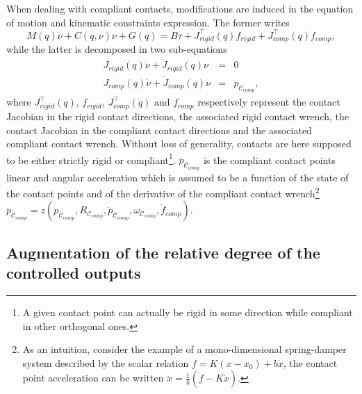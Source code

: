 \documentclass[12pt,a4paper,twoside]{article}
\begin{document}
When dealing with compliant contacts, modifications are induced in the equation of motion and kinematic constraints expression. The former writes
\begin{equation}
{M}(q) {\dot{\nu}}+{C}({q},{\nu}){\nu} + G(q) = {B} {\tau} + J^\top_{rigid} (q) f_{rigid} + J^\top_{comp} (q) f_{comp}, \label{eq:compliant dyn model}
\end{equation}
while the latter is decomposed in two sub-equations
\begin{subequations}\label{eq:kin constraints}
\begin{eqnarray}
J_{rigid}(q) \dot\nu + \dot{J}_{rigid}(q) \nu & = & 0 \label{eq:kin constraints rigid}\\  
J_{comp}(q) \dot\nu + \dot{J}_{comp}(q) \nu & = & \ddot{p}_{\mathcal{C}_{comp}}\label{eq:kin constraints comp},%
\end{eqnarray}               
\end{subequations}
where $J^\top_{rigid} (q)$, $f_{rigid}$, $J^\top_{comp} (q)$ and $f_{comp}$ respectively represent the contact Jacobian in the rigid contact directions, the associated rigid contact wrench, the contact Jacobian in the compliant contact directions and the associated compliant contact wrench. Without loss of generality, contacts are here supposed to be either strictly rigid or compliant\footnote{A given contact point can actually be rigid in some direction while compliant in other orthogonal ones.}. $\ddot{p}_{\mathcal{C}_{comp}}$ is the compliant contact points linear and angular acceleration which is assumed to be a function of the state of the contact points and of the derivative of the compliant contact wrench\footnote{As an intuition, consider the example of a mono-dimensional spring-damper system described by the scalar relation $ f = K (x-x_0) + b \dot{x} $, the contact point acceleration can be written $\ddot{x} = \frac{1}{b} ( \dot{f} - K \dot{x})$.} $\ddot{p}_{\mathcal{C}_{comp}} = z\left(p_{\mathcal{C}_{comp}},R_{\mathcal{C}_{comp}},\dot{p}_{\mathcal{C}_{comp}},\omega_{\mathcal{C}_{comp}},\dot{f}_{comp}\right)$.

 

\subsection{Augmentation of the relative degree of the controlled outputs}
\end{document}
